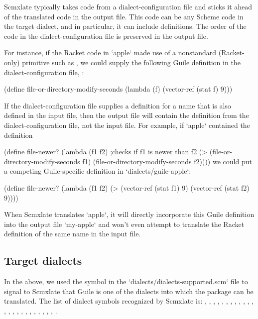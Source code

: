 Scmxlate typically takes code from a
dialect-configuration file and sticks it  ahead of the
translated code in the output file.  This code can be
any Scheme code in the target dialect, and in
particular, it can include definitions.  The order of
the code in the dialect-configuration file is preserved
in the output file.

For instance, if the Racket code in `apple` made
use of a nonstandard (Racket-only) primitive such as
, we could supply
the following Guile definition in the
dialect-configuration file,
:

\begintts
(define file-or-directory-modify-seconds
  (lambda (f) (vector-ref (stat f) 9)))
\endtt

If the dialect-configuration file supplies a definition for
a name that is also defined in the input file,
then the output file will contain the definition from
the dialect-configuration file, not the input file.
For example, if `apple` contained
the definition

\begintts
(define file-newer?
  (lambda (f1 f2)
    ;checks if f1 is newer than f2
    (> (file-or-directory-modify-seconds f1)
       (file-or-directory-modify-seconds f2))))
\endtt
we could put a competing Guile-specific definition
in `dialects/guile-apple`:

\begintts
(define file-newer?
  (lambda (f1 f2)
    (> (vector-ref (stat f1) 9)
       (vector-ref (stat f2) 9))))
\endtt

When Scmxlate translates `apple`, it will directly
incorporate this Guile definition into the output file
`my-apple` and won’t even attempt to translate
the Racket definition of the same name in the
input file.

\subsection{Target dialects}

In the above, we used the symbol  in the
`dialects/dialects-supported.scm` file to signal to
Scmxlate that Guile is one of the dialects into which
the package can be translated.  The list of dialect symbols
recognized by Scmxlate is: , ,
, , ,
, , , , , ,
, , , , ,
, ,
, , , , ,
, .

